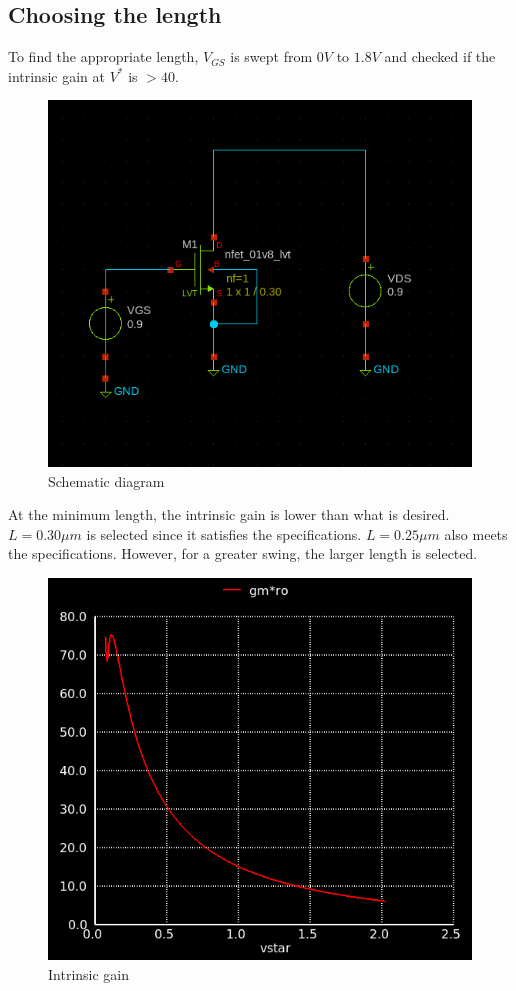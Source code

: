 \documentclass[conference]{IEEEtran}
\begin{document}
\subsection{Choosing the length}
To find the appropriate length, $V_{GS}$ is swept from $0V$ to $1.8V$ and checked if the intrinsic gain at $V^*$ is $> 40$.  
\begin{figure}[H]
	\centering 
	\includegraphics[width=\columnwidth]{schem.png}
	\caption{Schematic diagram}
	\label{schematic}
\end{figure}
At the minimum length, the intrinsic gain is lower than what is desired. $L=0.30\mu m$ is selected since it satisfies the specifications. $L=0.25\mu m$ also meets the specifications. However, for a greater swing, the larger length is selected. 
\begin{figure}[H]
	\centering 
	\includegraphics[scale=0.40]{gmro.png}
	\caption{Intrinsic gain}
	\label{gmro}
\end{figure}
\end{document}
